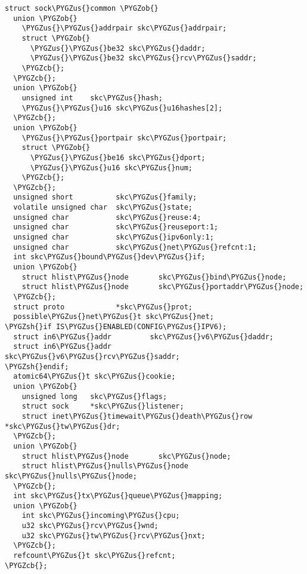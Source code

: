\documentclass[a4paper,8pt,english]{sphinxmanual}
\def\PYGZus{\char`\_}
\def\PYGZob{\char`\{}
\def\PYGZcb{\char`\}}
\def\PYGZsh{\char`\#}
\begin{document}
\begin{Verbatim}[commandchars=\\\{\}]
struct sock\PYGZus{}common \PYGZob{}
  union \PYGZob{}
    \PYGZus{}\PYGZus{}addrpair skc\PYGZus{}addrpair;
    struct \PYGZob{}
      \PYGZus{}\PYGZus{}be32 skc\PYGZus{}daddr;
      \PYGZus{}\PYGZus{}be32 skc\PYGZus{}rcv\PYGZus{}saddr;
    \PYGZcb{};
  \PYGZcb{};
  union \PYGZob{}
    unsigned int    skc\PYGZus{}hash;
    \PYGZus{}\PYGZus{}u16 skc\PYGZus{}u16hashes[2];
  \PYGZcb{};
  union \PYGZob{}
    \PYGZus{}\PYGZus{}portpair skc\PYGZus{}portpair;
    struct \PYGZob{}
      \PYGZus{}\PYGZus{}be16 skc\PYGZus{}dport;
      \PYGZus{}\PYGZus{}u16 skc\PYGZus{}num;
    \PYGZcb{};
  \PYGZcb{};
  unsigned short          skc\PYGZus{}family;
  volatile unsigned char  skc\PYGZus{}state;
  unsigned char           skc\PYGZus{}reuse:4;
  unsigned char           skc\PYGZus{}reuseport:1;
  unsigned char           skc\PYGZus{}ipv6only:1;
  unsigned char           skc\PYGZus{}net\PYGZus{}refcnt:1;
  int skc\PYGZus{}bound\PYGZus{}dev\PYGZus{}if;
  union \PYGZob{}
    struct hlist\PYGZus{}node       skc\PYGZus{}bind\PYGZus{}node;
    struct hlist\PYGZus{}node       skc\PYGZus{}portaddr\PYGZus{}node;
  \PYGZcb{};
  struct proto            *skc\PYGZus{}prot;
  possible\PYGZus{}net\PYGZus{}t skc\PYGZus{}net;
\PYGZsh{}if IS\PYGZus{}ENABLED(CONFIG\PYGZus{}IPV6);
  struct in6\PYGZus{}addr         skc\PYGZus{}v6\PYGZus{}daddr;
  struct in6\PYGZus{}addr         skc\PYGZus{}v6\PYGZus{}rcv\PYGZus{}saddr;
\PYGZsh{}endif;
  atomic64\PYGZus{}t skc\PYGZus{}cookie;
  union \PYGZob{}
    unsigned long   skc\PYGZus{}flags;
    struct sock     *skc\PYGZus{}listener;
    struct inet\PYGZus{}timewait\PYGZus{}death\PYGZus{}row *skc\PYGZus{}tw\PYGZus{}dr;
  \PYGZcb{};
  union \PYGZob{}
    struct hlist\PYGZus{}node       skc\PYGZus{}node;
    struct hlist\PYGZus{}nulls\PYGZus{}node skc\PYGZus{}nulls\PYGZus{}node;
  \PYGZcb{};
  int skc\PYGZus{}tx\PYGZus{}queue\PYGZus{}mapping;
  union \PYGZob{}
    int skc\PYGZus{}incoming\PYGZus{}cpu;
    u32 skc\PYGZus{}rcv\PYGZus{}wnd;
    u32 skc\PYGZus{}tw\PYGZus{}rcv\PYGZus{}nxt;
  \PYGZcb{};
  refcount\PYGZus{}t skc\PYGZus{}refcnt;
\PYGZcb{};
\end{Verbatim}
\end{document}
